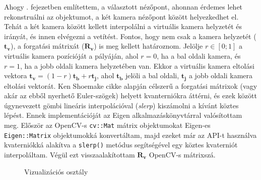 Ahogy . fejezetben említettem, a választott nézőpont, ahonnan érdemes lehet rekonstruálni az objektumot, a két kamera nézőpont között helyezkedhet el. Tehát a két kamera között kellett interpolálni a virtuális kamera helyzetét és irányát, és innen elvégezni a vetítést. Fontos, hogy nem csak a kamera helyzetét ($\mathbf{t_v}$), a forgatási mátrixát ($\mathbf{R_v}$) is meg kellett határoznom. Jelölje $r \in [0; 1]$ a virtuális kamera pozícióját a pályáján, ahol $r = 0$, ha a bal oldali kamera, és $r = 1$, ha a jobb oldali kamera helyzetében van. Ekkor a virtuális kamera eltolási vektora $\mathbf{t_v} = (1-r)\mathbf{t_b} + r\mathbf{t_j}$, ahol $\mathbf{t_b}$ jelöli a bal oldali, $\mathbf{t_j}$ a jobb oldali kamera eltolási vektorát. Ken Shoemake cikke \cite{quaternion} alapján célszerű a forgatási mátrixok (vagy akár az ebből nyerhető Euler-szögek) helyett kvanterniókra áttérni, és ezek között úgynevezett gömbi lineáris interpolációval (\textit{slerp}) kiszámolni a kívánt köztes lépést. Ennek implementációját az Eigen \cite{eigenweb} alkalmazáskönyvtárral valósítottam meg. Először az OpenCV-s \texttt{cv::Mat} mátrix objektumokat Eigen-es \texttt{Eigen::Matrix} objektumokká konvertáltam, majd ezeket már az API-t használva kvaterniókká alakítva a \texttt{slerp()} metódus segítségével egy köztes kvaterniót interpoláltam. Végül ezt visszaalakítottam $\mathbf{R_v}$ OpenCV-s mátrixszá.

\begin{figure}[tbh]
\centering


\caption{Vizualizációs osztály \label{fig:cd:visualization}}
\end{figure}

